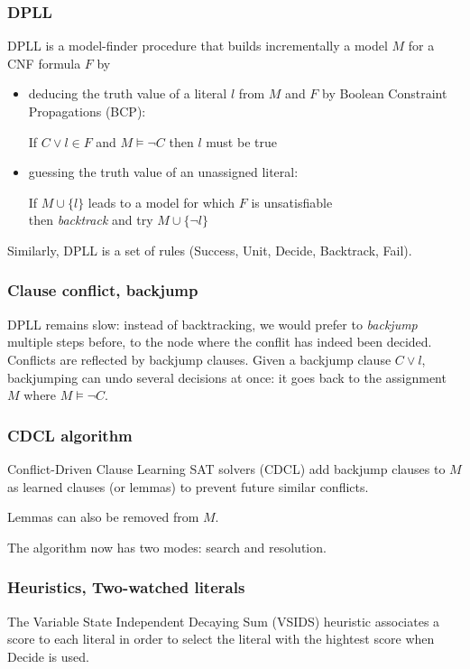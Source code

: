 \documentclass[toc]{../cs-classes/cs-classes}
\begin{document}
\subsubsection{DPLL}
DPLL is a model-finder procedure that builds incrementally a model $M$ for a CNF formula $F$ by
\begin{itemize}
    \item deducing the truth value of a literal $l$ from $M$ and $F$ by Boolean Constraint Propagations (BCP):
    \begin{center}
        If $C\lor l\in F$ and $M\vDash \lnot C$ then $l$ must be true
    \end{center}
    \item guessing the truth value of an unassigned literal:
    \begin{center}
        If $M\cup\{l\}$ leads to a model for which $F$ is unsatisfiable\\ then \emph{backtrack} and try $M\cup\{\lnot l\}$
    \end{center}
\end{itemize}

Similarly, DPLL is a set of rules (Success, Unit, Decide, Backtrack, Fail).

\subsubsection{Clause conflict, backjump}
DPLL remains slow: instead of backtracking, we would prefer to \emph{backjump} multiple steps before, to the node where the conflit has indeed been decided. Conflicts are reflected by backjump clauses. Given a backjump clause $C\lor l$, backjumping can undo several decisions at once: it goes back to the assignment $M$ where $M \vDash \lnot C$.

\subsubsection{CDCL algorithm}
Conflict-Driven Clause Learning SAT solvers (CDCL) add backjump clauses to $M$ as learned clauses (or lemmas) to prevent future similar conflicts. 

Lemmas can also be removed from $M$.

The algorithm now has two modes: search and resolution. 

\subsubsection{Heuristics, Two-watched literals}
The Variable State Independent Decaying Sum (VSIDS) heuristic associates a score to each literal in order to select the literal with the hightest score when Decide is used.
\end{document}
